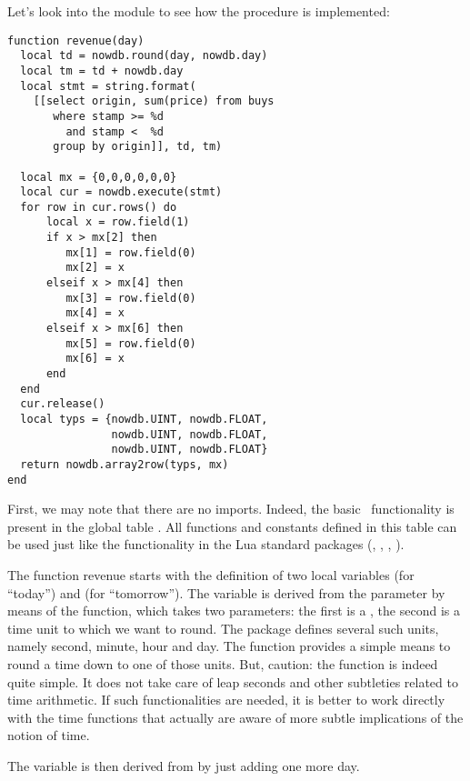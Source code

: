 \begin{minipage}{\textwidth}
Let's look into the module 
to see how the procedure is implemented:

\begin{lua}
\begin{lstlisting}
function revenue(day)
  local td = nowdb.round(day, nowdb.day)
  local tm = td + nowdb.day
  local stmt = string.format(
    [[select origin, sum(price) from buys
       where stamp >= %d
         and stamp <  %d
       group by origin]], td, tm)

  local mx = {0,0,0,0,0,0}
  local cur = nowdb.execute(stmt)
  for row in cur.rows() do
      local x = row.field(1)
      if x > mx[2] then
         mx[1] = row.field(0)
         mx[2] = x
      elseif x > mx[4] then
         mx[3] = row.field(0)
         mx[4] = x
      elseif x > mx[6] then 
         mx[5] = row.field(0)
         mx[6] = x
      end
  end
  cur.release()
  local typs = {nowdb.UINT, nowdb.FLOAT,
                nowdb.UINT, nowdb.FLOAT,
                nowdb.UINT, nowdb.FLOAT}
  return nowdb.array2row(typs, mx)
end
\end{lstlisting}
\end{lua}
\end{minipage}

First, we may note that there are no imports.
Indeed, the basic \nowdb\ functionality is
present in the global table .
All functions and constants defined in
this table can be used just like the functionality
in the Lua standard packages (,
, , \etc).

The function revenue starts with
the definition of two local variables
 (for ``today'') and  (for ``tomorrow'').
The variable  is derived from the parameter
by means of the  function, which
takes two parameters: the first is a ,
the second is a time unit to which we want to round.
The  package defines several such units,
namely second, minute, hour and day.
The  function provides a simple means
to round a time down to one of those units.
But, caution: the function is indeed quite simple.
It does not take care of leap seconds and other
subtleties related to time arithmetic. If such
functionalities are needed, it is better to work
directly with the  time functions
that actually are aware of more subtle implications
of the notion of time.

The variable  is then derived from 
by just adding one more day.

